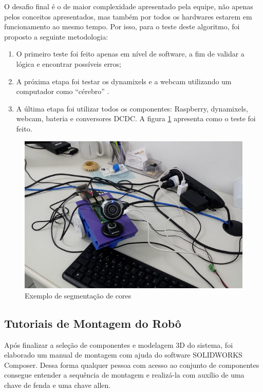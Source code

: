 O desafio final é o de maior complexidade apresentado pela equipe, não apenas pelos conceitos apresentados, mas também por todos os hardwares estarem em funcionamento ao mesmo tempo. Por isso, para o teste deste algoritmo, foi proposto a seguinte metodologia:

\begin{enumerate}
	\item O primeiro teste foi feito apenas em nível de software, a fim de validar a lógica e encontrar possíveis erros;
	\item A próxima etapa foi testar os dynamixels e a webcam utilizando um computador como “cérebro” .
	\item A última etapa foi utilizar todos os componentes: Raspberry, dynamixels, webcam, bateria e conversores DCDC. A figura \ref{fig:testefinal} apresenta como o teste foi feito.
\end{enumerate}
 
 \begin{figure}[H]
 	\centering
 	\includegraphics[scale=0.75, angle=0]{Figures/testefinal.png}
 	\caption{Exemplo de segmentação de cores}
 	\label{fig:testefinal}
 \end{figure}

\subsection{Tutoriais de Montagem do Robô}
Após finalizar a seleção de componentes e modelagem 3D do sistema, foi elaborado um manual de montagem com ajuda do software SOLIDWORKS Composer. Dessa forma
qualquer pessoa com acesso ao conjunto de componentes consegue entender a sequência de montagem e realizá-la com auxílio de uma chave de fenda e uma chave allen. \cite{tutMont}

